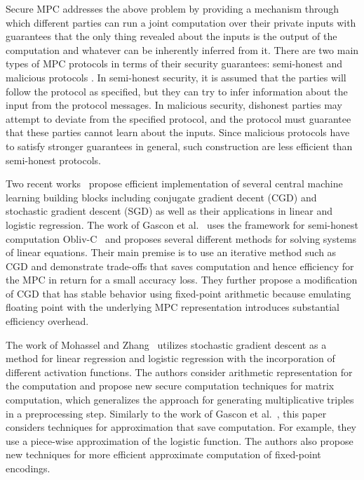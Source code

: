 \documentclass{article}
\begin{document}
Secure MPC addresses the above problem by providing a mechanism through which different parties can run a joint computation over their private inputs with guarantees that the only thing
revealed about the inputs is the output of the computation and whatever can be inherently inferred from it.
There are two main types of MPC protocols in terms of their security guarantees: semi-honest and malicious protocols \cite{Goldreich:2004:FCV:975541, cryptoeprint:2010:551}. In semi-honest security, it is assumed that the parties will follow the protocol as specified, but they can try to infer information about the input from the protocol messages. In malicious security, dishonest parties may attempt to deviate from the specified protocol, and the protocol must guarantee that these parties cannot learn about the inputs. Since malicious protocols have to satisfy stronger guarantees in general, such construction are less efficient than semi-honest protocols.

Two recent works~\cite{GSB0DZE17, MZ17} propose efficient implementation of several central machine learning building blocks including conjugate gradient decent (CGD) and stochastic gradient descent (SGD) as well as their applications in linear and logistic regression. The work of Gascon et al.~\cite{GSB0DZE17} uses the framework for semi-honest computation Obliv-C~\cite{cryptoeprint:2015:1153} and proposes
several different methods for solving systems of linear equations. Their main premise is to use an iterative method such as CGD and demonstrate trade-offs that saves computation and hence efficiency for the MPC in
return for a small accuracy loss. They further propose a modification of CGD that has stable behavior using fixed-point arithmetic because emulating floating point with the underlying MPC representation introduces substantial
efficiency overhead.

The work of Mohassel and Zhang~\cite{MZ17} utilizes stochastic gradient descent as a method for linear regression and logistic regression with the incorporation of different activation functions. The authors consider
arithmetic representation for the computation and propose new secure computation techniques for matrix computation, which generalizes the approach for generating multiplicative triples in a preprocessing step.
 Similarly to the work of Gascon et al.~\cite{GSB0DZE17}, this paper considers techniques for approximation that save computation. For example, they use a piece-wise approximation of the logistic function. The authors
 also propose new techniques for more efficient approximate computation of fixed-point encodings.
\end{document}
